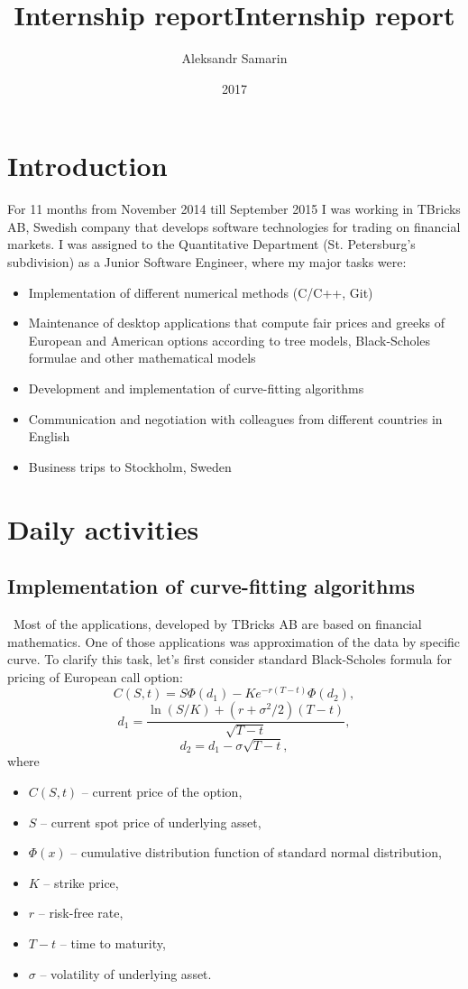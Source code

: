 \documentclass[]{article}
\title{Internship report}
\author{Aleksandr Samarin}
\date{2017}
\title{Internship report}
\begin{document}
\maketitle

\section{Introduction}
For 11 months from November 2014 till September 2015 I was working in TBricks AB, Swedish company that develops software technologies for trading on financial markets. I was assigned to the Quantitative Department (St. Petersburg's subdivision) as a Junior Software Engineer, where my major tasks were:
\begin{itemize}
	\item Implementation of different numerical methods (C/C++, Git)
	\item Maintenance of desktop applications that compute fair prices and greeks of European and American options according to tree models, Black-Scholes formulae and other mathematical models
	\item Development and implementation of curve-fitting algorithms
	\item Communication and negotiation with colleagues from different countries in English
	\item Business trips to Stockholm, Sweden
\end{itemize}

\section{Daily activities}
\subsection*{Implementation of curve-fitting algorithms} \
Most of the applications, developed by TBricks AB are based on financial mathematics. One of those applications was approximation of the data by specific curve. To clarify this task, let's first consider standard Black-Scholes formula for pricing of European call option:
\begin{equation}\label{bs}
	C(S, t) = S\Phi(d_1) - Ke^{-r(T-t)} \Phi(d_2),
\end{equation}
\[ d_1 = \frac{\ln(S / K) + (r + \sigma^2 / 2) (T - t) }{\sqrt{T-t}}, \]
\[ d_2 = d_1 - \sigma \sqrt{T-t}, \]
where
\begin{itemize}
	\item $C(S, t)$ -- current price of the option,
	\item $S$ -- current spot price of underlying asset,
	\item $\Phi(x)$ -- cumulative distribution function of standard normal distribution,
	\item $K$ -- strike price,
	\item $r$ -- risk-free rate,
	\item $T - t$ -- time to maturity,
	\item $\sigma$ -- volatility of underlying asset.
\end{itemize}
\end{document}
